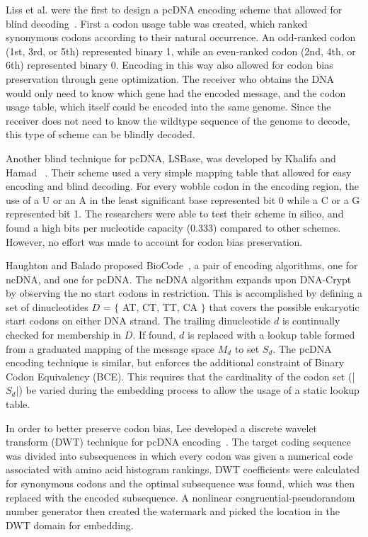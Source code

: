 \documentclass{bioinfo}
\begin{document}
Liss et al. were the first to design a pcDNA encoding scheme that allowed for blind decoding~\cite{LDBKHLW2012PO}. First a codon usage table was created, which ranked synonymous codons according to their natural occurrence. An odd-ranked codon (1st, 3rd, or 5th) represented binary 1, while an even-ranked codon (2nd, 4th, or 6th) represented binary 0. Encoding in this way also allowed for codon bias preservation through gene optimization. The receiver who obtains the DNA would only need to know which gene had the encoded message, and the codon usage table, which itself could be encoded into the same genome. Since the receiver does not need to know the wildtype sequence of the genome to decode, this type of scheme can be blindly decoded.

Another blind technique for pcDNA, LSBase, was developed by Khalifa and Hamad ~\cite{KH2015BJOMACS}. Their scheme used a very simple mapping table that allowed for easy encoding and blind decoding. For every wobble codon in the encoding region, the use of a U or an A in the least significant base represented bit 0 while a C or a G represented bit 1. The researchers were able to test their scheme in silico, and found a high bits per nucleotide capacity (0.333) compared to other schemes. However, no effort was made to account for codon bias preservation.

Haughton and Balado proposed BioCode~\cite{HBBMC2013}, a pair of encoding algorithms, one for ncDNA, and one for pcDNA. The ncDNA algorithm expands upon DNA-Crypt by observing the no start codons in restriction. This is accomplished by defining a set of dinucleotides $D$ = $\{$ AT, CT, TT, CA $\}$ that covers the possible eukaryotic start codons on either DNA strand. The trailing dinucleotide $d$ is continually checked for membership in $D$. If found, $d$ is replaced with a lookup table formed from a graduated mapping of the message space $M_d$ to set $S_d$. The pcDNA encoding technique is similar, but enforces the additional constraint of Binary Codon Equivalency (BCE). This requires that the cardinality of the codon set (|$S_d$|) be varied during the embedding process to allow the usage of a static lookup table.

In order to better preserve codon bias, Lee developed a discrete wavelet transform (DWT) technique for pcDNA encoding~\cite{L2014IS}. The target coding sequence was divided into subsequences in which every codon was given a numerical code associated with amino acid histogram rankings. DWT coefficients were calculated for synonymous codons and the optimal subsequence was found, which was then replaced with the encoded subsequence. A nonlinear congruential-pseudorandom number generator then created the watermark and picked the location in the DWT domain for embedding.
\end{document}

